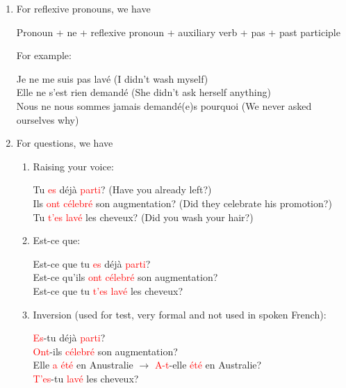 \documentclass{book}
\begin{document}
\begin{enumerate}
    \item For reflexive pronouns, we have
    \begin{center}
        Pronoun + ne + reflexive pronoun + auxiliary verb + pas + past participle
    \end{center}
    For example:
    \begin{center}
        Je ne me suis pas lavé (I didn't wash myself) \\
        Elle ne s'est rien demandé (She didn't ask herself anything) \\
        Nous ne nous sommes jamais demandé(e)s pourquoi (We never asked ourselves why)
    \end{center}
    
    \item For questions, we have
    \begin{enumerate}
        \item Raising your voice:
        \begin{center}
            Tu \textcolor{red}{es} déjà \textcolor{red}{parti}? (Have you already left?) \\
            Ils \textcolor{red}{ont célebré} son augmentation? (Did they celebrate his promotion?) \\
            Tu \textcolor{red}{t'es lavé} les cheveux? (Did you wash your hair?) 
        \end{center}

        \item Est-ce que:
        \begin{center}
            Est-ce que tu \textcolor{red}{es} déjà \textcolor{red}{parti}? \\
            Est-ce qu'ils \textcolor{red}{ont célebré} son augmentation? \\
            Est-ce que tu \textcolor{red}{t'es lavé} les cheveux? 
        \end{center}

        \item Inversion (used for test, very formal and not used in spoken French):
        \begin{center}
            \textcolor{red}{Es}-tu déjà \textcolor{red}{parti}? \\
            \textcolor{red}{Ont}-ils \textcolor{red}{célebré} son augmentation? \\
            Elle \textcolor{red}{a été} en Anustralie $\to$ \textcolor{red}{A-t}-elle \textcolor{red}{été} en Australie? \\
            \textcolor{red}{T'es}-tu \textcolor{red}{lavé} les cheveux?
        \end{center}
    \end{enumerate}
\end{enumerate}
\end{document}

